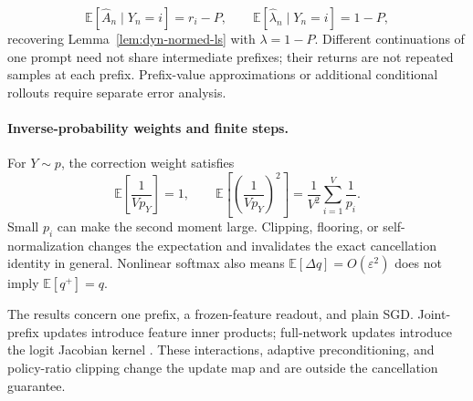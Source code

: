 \[
 \mathbb E[\widehat A_n\mid Y_n=i]=r_i-P,\qquad
 \mathbb E[\widehat\lambda_n\mid Y_n=i]=1-P,
\]
recovering Lemma~\ref{lem:dyn-normed-ls} with $\lambda=1-P$.
Different continuations of one prompt need not share intermediate prefixes;
their returns are not repeated samples at each prefix. Prefix-value
approximations or additional conditional rollouts require separate error
analysis.

\paragraph{Inverse-probability weights and finite steps.}
For $Y\sim p$, the correction weight satisfies
\begin{equation}
 \mathbb E\left[\frac1{Vp_Y}\right]=1,\qquad
 \mathbb E\left[\left(\frac1{Vp_Y}\right)^2\right]
 =\frac1{V^2}\sum_{i=1}^V\frac1{p_i}.
 \label{eq:dyn-weight-moment}
\end{equation}
Small $p_i$ can make the second moment large. Clipping, flooring, or
self-normalization changes the expectation and invalidates the exact
cancellation identity in general. Nonlinear softmax also means
$\mathbb E[\Delta q]=O(\varepsilon^2)$ does not imply $\mathbb E[q^+]=q$.

The results concern one prefix, a frozen-feature readout, and plain SGD.
Joint-prefix updates introduce feature inner products; full-network updates
introduce the logit Jacobian kernel \citep{ren_learning_2025}.
These interactions, adaptive preconditioning, and policy-ratio clipping
change the update map and are outside the cancellation guarantee.
